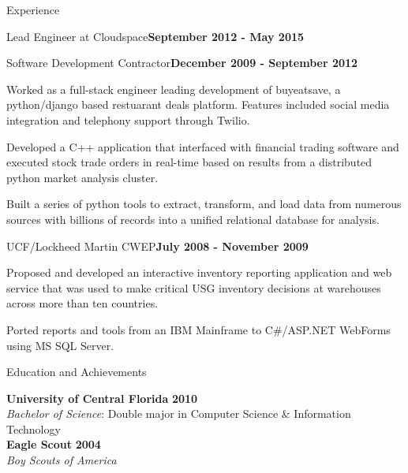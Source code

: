\documentclass{resume} %
\begin{document}
\begin{rSection}{Experience}
\begin{rSubsection}{Lead Engineer at Cloudspace}{\bf September 2012 - May 2015}{}{}
\end{rSubsection}


\begin{rSubsection}{Software Development Contractor}{\bf December 2009 - September 2012}{}{}

\item Worked as a full-stack engineer leading development of buyeatsave, a python/django based restuarant deals platform.  Features included social media integration and telephony support through Twilio.
\item Developed a C++ application that interfaced with financial trading software and executed stock trade orders in real-time based on results from a distributed python market analysis cluster.
\item Built a series of python tools to extract, transform, and load data from numerous sources with billions of records into a unified relational database for analysis.


\end{rSubsection}


\begin{rSubsection}{UCF/Lockheed Martin CWEP}{\bf July 2008 - November 2009}{}{}

\item Proposed and developed an interactive inventory reporting application and web service that was used to make critical USG inventory decisions at warehouses across more than ten countries.
\item Ported reports and tools from an IBM Mainframe to C\#/ASP.NET WebForms using MS SQL Server.

\end{rSubsection}


\end{rSection}


\begin{rSection}{Education and Achievements}

{\bf University of Central Florida} \hfill {\bf 2010} \\ 
{\it Bachelor of Science}: Double major in Computer Science \& Information Technology \\
{\bf Eagle Scout} \hfill {\bf 2004} \\ 
{\it Boy Scouts of America} \\
\end{rSection}
\end{document}
